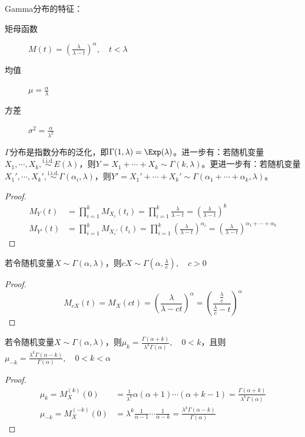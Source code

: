 Gamma分布的特征：
\begin{description}
    \item[矩母函数] $M(t)=(\frac{\lambda}{\lambda-t})^{\alpha} , \quad t<\lambda$
    \item[均值] $\mu=\frac{\alpha}{\lambda}$
    \item[方差] $\sigma^2=\frac{\alpha}{\lambda^{2}}$
\end{description}

\begin{proposition}\label{prop:sum_of_Gamma}
    $\Gamma$分布是指数分布的泛化，即$\Gamma(1,\lambda)=\Exp(\lambda)$。进一步有：若随机变量$X_1,\cdots ,X_k, \overset{\text{i.i.d.}}{\sim} E(\lambda)$，则$Y=X_1+\cdots+X_k \sim \Gamma(k,\lambda)$。更进一步有：若随机变量$X_1',\cdots ,X_k', \overset{\text{i.i.d.}}{\sim} \Gamma(\alpha_i,\lambda)$，则$Y'=X_1'+\cdots+X_k'  \sim \Gamma(\alpha_1+\cdots +\alpha_k,\lambda)$。
\end{proposition}
\begin{proof}
    \begin{align*}
        M_Y(t)    & =\prod_{i=1}^k M_{X_i}(t_i)=\prod_{i=1}^k \frac{\lambda}{\lambda-t}=(\frac{\lambda}{\lambda-t})^{k}                                       \\
        M_{Y'}(t) & =\prod_{i=1}^k M_{X_i'}(t_i)=\prod_{i=1}^k (\frac{\lambda}{\lambda-t})^{\alpha_i}=(\frac{\lambda}{\lambda-t})^{\alpha_1+\cdots +\alpha_k}
    \end{align*}
\end{proof}

\begin{proposition}\label{prop:times_of_Gamma}
    若令随机变量$X \sim \Gamma(\alpha,\lambda)$，则$cX \sim \Gamma(\alpha,\frac{\lambda}{c}), \quad c>0$
\end{proposition}
\begin{proof}
    \[ M_{c X}(t) = M_X(c t) =(\frac{\lambda}{\lambda-c t})^{\alpha}=(\frac{\frac{\lambda}{c}}{\frac{\lambda}{c}-t})^{\alpha}\]
\end{proof}

\begin{proposition}
    若令随机变量$X \sim \Gamma(\alpha,\lambda)$，则$\mu_k=\frac{\Gamma(\alpha+k)}{\lambda^{k}\Gamma(\alpha)}, \quad 0<k$，且则$\mu_{-k}=\frac{\lambda^{k}\Gamma(\alpha-k)}{\Gamma(\alpha)}, \quad 0<k<\alpha$
\end{proposition}
\begin{proof}
    \begin{align*}
        \mu_k=M_X^{(k)}(0)     & =\frac{1}{\lambda^{k}}\alpha(\alpha+1)\cdots(\alpha+k-1) =\frac{\Gamma(\alpha+k)}{\lambda^{k}\Gamma(\alpha)} \\
        \mu_{-k}=M_X^{(-k)}(0) & =\lambda^{k}\frac{1}{\alpha-1}\cdots\frac{1}{\alpha-k} =\frac{\lambda^{k}\Gamma(\alpha-k)}{\Gamma(\alpha)}
    \end{align*}
\end{proof}

